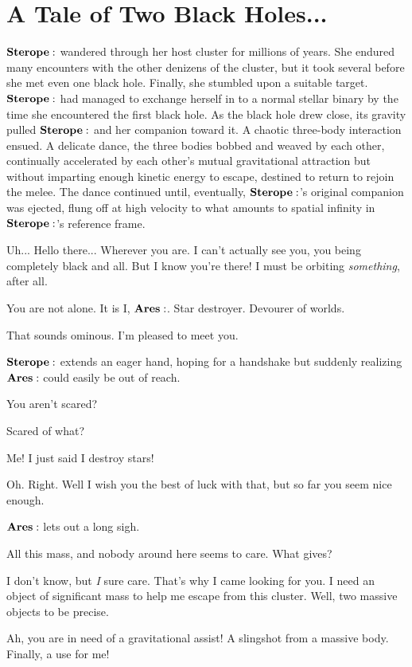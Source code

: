 \documentclass[main.tex]{subfiles}
\begin{document}
\section{A Tale of Two Black Holes...}

$\Sterope$ wandered through her host cluster for millions of years.  She endured many encounters with the other denizens of the cluster, but it took several before she met even one black hole.  Finally, she stumbled upon a suitable target.  $\Sterope$ had managed to exchange herself in to a normal stellar binary by the time she encountered the first black hole.  As the black hole drew close, its gravity pulled $\Sterope$ and her companion toward it.  A chaotic three-body interaction ensued.  A delicate dance, the three bodies bobbed and weaved by each other, continually accelerated by each other's mutual gravitational attraction but without imparting enough kinetic energy to escape, destined to return to rejoin the melee.  The dance continued until, eventually, $\Sterope$'s original companion was ejected, flung off at high velocity to what amounts to spatial infinity in $\Sterope$'s reference frame.

\Sterope Uh... Hello there... Wherever you are.  I can't actually see you, you being completely black and all.  But I know you're there!  I must be orbiting \textit{something}, after all.

\Ares You are not alone.  It is I, $\Ares$.  Star destroyer.  Devourer of worlds.

\Sterope That sounds ominous.  I'm pleased to meet you.

$\Sterope$ extends an eager hand, hoping for a handshake but suddenly realizing $\Ares$ could easily be out of reach.

\Ares You aren't scared?

\Sterope Scared of what?

\Ares Me!  I just said I destroy stars!

\Sterope Oh.  Right.  Well I wish you the best of luck with that, but so far you seem nice enough.

$\Ares$ lets out a long sigh.

\Ares All this mass, and nobody around here seems to care.  What gives?

\Sterope I don't know, but \textit{I} sure care.  That's why I came looking for you.  I need an object of significant mass to help me escape from this cluster.  Well, two massive objects to be precise.  

\Ares Ah, you are in need of a gravitational assist!  A slingshot from a massive body.  Finally, a use for me!
\end{document}
